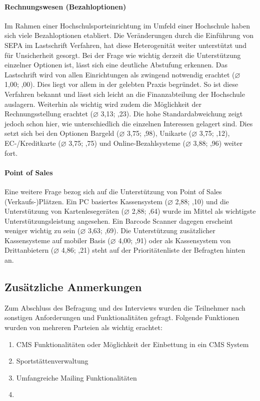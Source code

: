 \paragraph*{Rechnungswesen (Bezahloptionen)}
Im Rahmen einer Hochschulsporteinrichtung im Umfeld einer Hochschule haben sich viele Bezahloptionen etabliert. Die Veränderungen durch die Einführung von SEPA im Lastschrift Verfahren, hat diese Heterogenität weiter unterstützt und für Unsicherheit gesorgt. Bei der Frage wie wichtig derzeit die Unterstützung einzelner Optionen ist, lässt sich eine deutliche Abstufung erkennen. Das Lastschrift wird von allen Einrichtungen als zwingend notwendig erachtet ($\varnothing$ 1,00; ,00). Dies liegt vor allem in der gelebten Praxis begründet. So ist diese Verfahren bekannt und lässt sich leicht an die Finanzabteilung der Hochschule auslagern. 
Weiterhin als wichtig wird zudem die Möglichkeit der Rechnungsstellung erachtet ($\varnothing$ 3,13; ,23). Die hohe Standardabweichung zeigt jedoch schon hier, wie unterschiedlich die einzelnen Interessen gelagert sind. Dies setzt sich bei den Optionen Bargeld ($\varnothing$ 3,75; ,98), Unikarte ($\varnothing$ 3,75; ,12), EC-/Kreditkarte ($\varnothing$ 3,75; ,75) und Online-Bezahlsysteme ($\varnothing$ 3,88; ,96) weiter fort.

\paragraph*{Point of Sales}
Eine weitere Frage bezog sich auf die Unterstützung von Point of Sales (Verkaufs-)Plätzen. Ein PC basiertes Kassensystem ($\varnothing$ 2,88; ,10) und die Unterstützung von Kartenlesegeräten ($\varnothing$ 2,88; ,64) wurde im Mittel als wichtigste Unterstützungsleistung angesehen. Ein Barcode Scanner dagegen erscheint weniger wichtig zu sein ($\varnothing$ 3,63; ,69). Die Unterstützung zusätzlicher Kassensysteme auf mobiler Basis ($\varnothing$ 4,00; ,91) oder als Kassensystem von Drittanbietern ($\varnothing$ 4,86; ,21) steht auf der Prioritätenliste der Befragten hinten an.

\subsection{Zusätzliche Anmerkungen}
Zum Abschluss des Befragung und des Interviews wurden die Teilnehmer nach sonstigen Anforderungen und Funktionalitäten gefragt. Folgende Funktionen wurden von mehreren Parteien als wichtig erachtet:
\begin{enumerate}
\item CMS Funktionalitäten oder Möglichkeit der Einbettung in ein CMS System
\item Sportstättenverwaltung
\item Umfangreiche Mailing Funktionalitäten
\item 
\end{enumerate}


